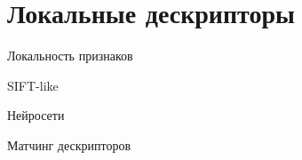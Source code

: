 \section{Локальные дескрипторы}


\begin{frame}{Локальность признаков}
    
\end{frame}

\begin{frame}{SIFT-like}
    
\end{frame}

\begin{frame}{Нейросети}
    
\end{frame}

\begin{frame}{Матчинг дескрипторов}
    
\end{frame}
